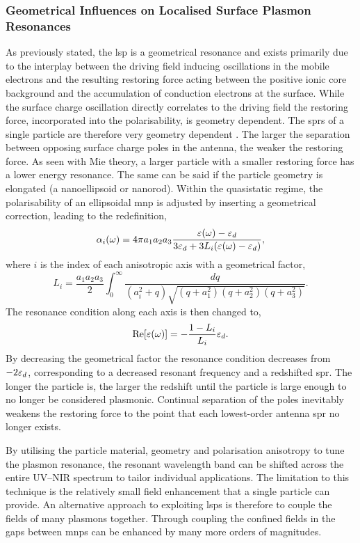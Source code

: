 \documentclass{article}
\begin{document}
\subsubsection{Geometrical Influences on Localised Surface Plasmon Resonances}

As previously stated, the \gls{lsp} is a geometrical resonance and exists primarily due to the interplay between the driving field inducing oscillations in the mobile electrons and the resulting restoring force acting between the positive ionic core background and the accumulation of conduction electrons at the surface. While the surface charge oscillation directly correlates to the driving field the restoring force, incorporated into the polarisability, is geometry dependent. The \glspl{spr} of a single particle are therefore very geometry dependent \cite{krenn2000, mock2002, kuwata2003}.
The larger the separation between opposing surface charge poles in the antenna, the weaker the restoring force. As seen with Mie theory, a larger particle with a smaller restoring force has a lower energy resonance. The same can be said if the particle geometry is elongated (a nanoellipsoid or nanorod). Within the quasistatic regime, the polarisability of an ellipsoidal \gls{mnp} is adjusted by inserting a geometrical correction, leading to the redefinition,
\begin{equation}
\alpha_i(\omega) = 4\pi a_1a_2a_3\frac{\varepsilon(\omega)-\varepsilon_d}{3\varepsilon_d+3L_i(\varepsilon(\omega)-\varepsilon_d)},
\end{equation}
where $i$ is the index of each anisotropic axis with a geometrical factor,
\begin{equation}
L_i = \frac{a_1a_2a_3}{2}\int_0^\infty \frac{dq}{(a_i^2+q)\sqrt{(q+a_1^2)(q+a_2^2)(q+a_3^2)}}.
\end{equation}
The resonance condition along each axis is then changed to,
\begin{equation}
\mathrm{Re}\!\left[{\varepsilon(\omega)}\right] = -\frac{1 - L_i}{L_i}\varepsilon_d.
\end{equation}
By decreasing the geometrical factor the resonance condition decreases from $-2\varepsilon_d$, corresponding to a decreased resonant frequency and a redshifted \gls{spr}. The longer the particle is, the larger the redshift until the particle is large enough to no longer be considered plasmonic. Continual separation of the poles inevitably weakens the restoring force to the point that each lowest-order antenna \gls{spr} no longer exists.

By utilising the particle material, geometry and polarisation anisotropy to tune the plasmon resonance, the resonant wavelength band can be shifted across the entire UV--NIR spectrum to tailor individual applications. The limitation to this technique is the relatively small field enhancement that a single particle can provide.
An alternative approach to exploiting \glspl{lsp} is therefore to couple the fields of many plasmons together. Through coupling the confined fields in the gaps between \glspl{mnp} can be enhanced by many more orders of magnitudes.
\end{document}
